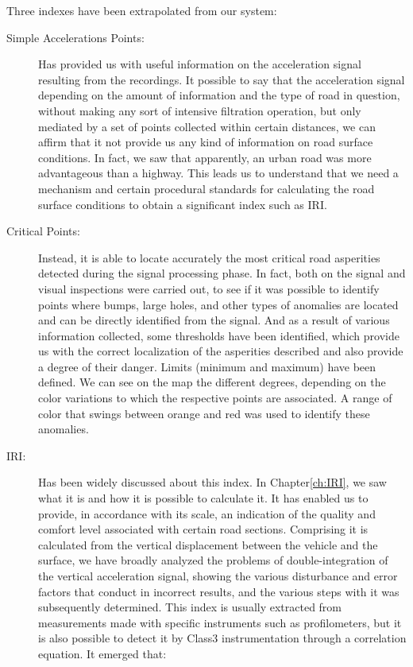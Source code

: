 \documentclass[tesi]{subfiles}
\begin{document}
 Three indexes have been extrapolated from our system:
\begin{description}
\item[Simple Accelerations Points:] Has provided us with useful information on the acceleration signal resulting from the recordings. It possible to say that the acceleration signal depending on the amount of information and the type of road in question, without making any sort of intensive filtration operation, but only mediated by a set of points collected within certain distances, we can affirm that it not provide us any kind of information on road surface conditions. In fact, we saw that apparently, an urban road was more advantageous than a highway. This leads us to understand that we need a mechanism and certain procedural standards for calculating the road surface conditions to obtain a significant index such as IRI.
\item[Critical Points:] Instead, it is able to locate accurately the most critical road asperities detected during the signal processing phase. In fact, both on the signal and visual inspections were carried out, to see if it was possible to identify points where bumps, large holes, and other types of anomalies are located and can be directly identified from the signal. And as a result of various information collected, some thresholds have been identified, which provide us with the correct localization of the asperities described and also provide a degree of their danger. Limits (minimum and maximum) have been defined. We can see on the map the different degrees, depending on the color variations to which the respective points are associated. A range of color that swings between orange and red was used to identify these anomalies.
\item[IRI:] Has been widely discussed about this index. In Chapter\ref{ch:IRI}, we saw what it is and how it is possible to calculate it.
It has enabled us to provide, in accordance with its scale, an indication of the quality and comfort level associated with certain road sections. Comprising it is calculated from the vertical displacement between the vehicle and the surface, we have broadly analyzed the problems of double-integration of the vertical acceleration signal, showing the various disturbance and error factors that conduct in incorrect results, and the various steps with it was subsequently determined. This index is usually extracted from measurements made with specific instruments such as profilometers, but it is also possible to detect it by Class3 instrumentation through a correlation equation. It emerged that:

\end{description}
\end{document}
